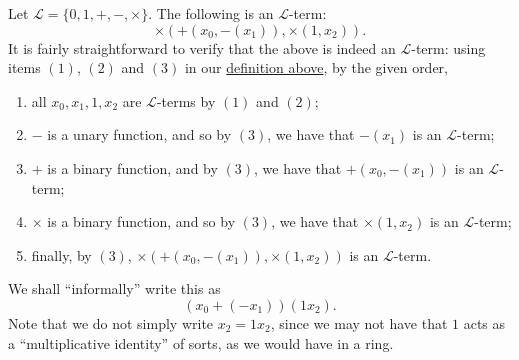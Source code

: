 \documentclass[notoc,notitlepage]{tufte-book}
\begin{document}
\begin{eg}
  Let $\mathcal{L} = \{ 0, 1, +, -, \times \}$. The following is an $\mathcal{L}$-term:
  \begin{equation*}
    \times ( + ( x_0, - (x_1) ), \times ( 1, x_2 ) ).
  \end{equation*}
  It is fairly straightforward to verify that the above is indeed an $\mathcal{L}$-term: using items $(1)$, $(2)$ and $(3)$ in our \hyperref[defn:l_terms]{definition above}, by the given order,
  \begin{enumerate}
    \item all $x_0, x_1, 1, x_2$ are $\mathcal{L}$-terms by $(1)$ and $(2)$;
    \item $-$ is a unary function, and so by $(3)$, we have that $-(x_1)$ is an $\mathcal{L}$-term;
    \item $+$ is a binary function, and by $(3)$, we have that $+ ( x_0, - (x_1) )$ is an $\mathcal{L}$-term;
    \item $\times$ is a binary function, and so by $(3)$, we have that $\times (1, x_2)$ is an $\mathcal{L}$-term;
    \item finally, by $(3)$, $\times( + ( x_0, - (x_1) ), \times ( 1, x_2 ) )$ is an $\mathcal{L}$-term.
  \end{enumerate}
  We shall ``informally'' write this as
  \begin{equation*}
    (x_0 + (- x_1))(1 x_2).
  \end{equation*}
  Note that we do not simply write $x_2 = 1 x_2$, since we may not have that $1$ acts as a ``multiplicative identity'' of sorts, as we would have in a ring.
\end{eg}
\end{document}

